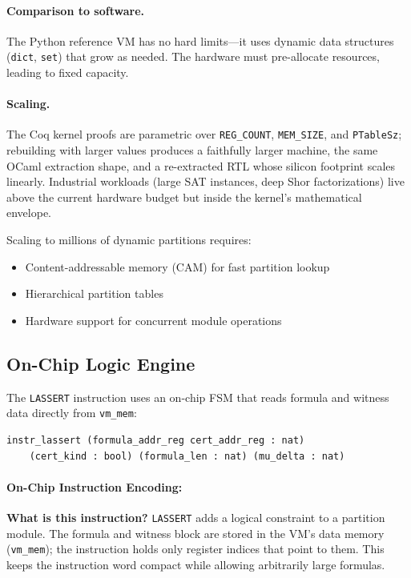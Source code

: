 \paragraph{Comparison to software.}
The Python reference VM has no hard limits---it uses dynamic data structures (\texttt{dict}, \texttt{set}) that grow as needed. The hardware must pre-allocate resources, leading to fixed capacity.

\paragraph{Scaling.}
The Coq kernel proofs are parametric over \texttt{REG\_COUNT}, \texttt{MEM\_SIZE}, and \texttt{PTableSz}; rebuilding with larger values produces a faithfully larger machine, the same OCaml extraction shape, and a re-extracted RTL whose silicon footprint scales linearly. Industrial workloads (large SAT instances, deep Shor factorizations) live above the current hardware budget but inside the kernel's mathematical envelope.

Scaling to millions of dynamic partitions requires:
\begin{itemize}
    \item Content-addressable memory (CAM) for fast partition lookup
    \item Hierarchical partition tables
    \item Hardware support for concurrent module operations
\end{itemize}

\subsection{On-Chip Logic Engine}

The \texttt{LASSERT} instruction uses an on-chip FSM that reads formula and witness data directly from \texttt{vm\_mem}:
\begin{lstlisting}
instr_lassert (formula_addr_reg cert_addr_reg : nat)
    (cert_kind : bool) (formula_len : nat) (mu_delta : nat)
\end{lstlisting}

\paragraph{On-Chip Instruction Encoding:}

\textbf{What is this instruction?} \texttt{LASSERT} adds a logical constraint to a partition module. The formula and witness block are stored in the VM's data memory (\texttt{vm\_mem}); the instruction holds only register indices that point to them. This keeps the instruction word compact while allowing arbitrarily large formulas.

